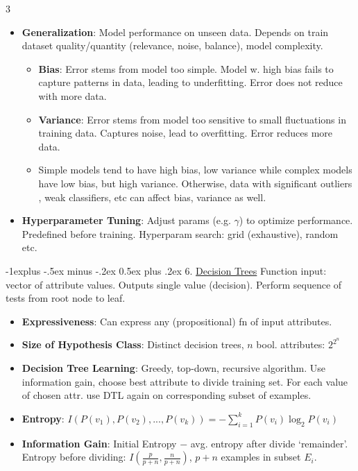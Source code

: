 \documentclass[a4paper, 9pt, landscape]{article}
\makeatletter
\renewcommand{\subsection}{\@startsection{subsection}{2}{0mm}%
                                {-1explus -.5ex minus -.2ex}%
                                {0.5ex plus .2ex}%
                                {\normalfont\normalsize\bfseries}}
\makeatother
\begin{document}
\begin{multicols*}{3}
\begin{itemize}[itemsep=-2pt]
\begin{itemize}[itemsep=-1.5pt]
            Recall ($\frac{TP}{TP + FN}$ - opt if FN costly), F1 Score: $\frac{2}{\frac{1}{P} +\frac{1}{R}} $
        \end{itemize}
        \item \textbf{Generalization}: Model performance on unseen data. Depends on train dataset quality/quantity (relevance, noise, balance), model complexity.
        \begin{itemize}
			\item \textbf{Bias}: Error stems from model too simple. Model w. high bias fails to capture patterns in data, leading to underfitting. Error does not reduce with more data.
			\item \textbf{Variance}: Error stems from model too sensitive to small fluctuations in training data. Captures noise, lead to overfitting. Error reduces more data.
			\item Simple models tend to have high bias, low variance while complex models have low bias, but high variance. Otherwise, data with significant outliers , weak classifiers, etc can affect bias, variance as well.
		\end{itemize}
        \item \textbf{Hyperparameter Tuning}: Adjust params (e.g. $\gamma$) to optimize performance. Predefined before training. Hyperparam search: grid (exhaustive), random etc. 
\end{itemize}


\subsection{6. \underline{Decision Trees}}
Function input: vector of attribute values. Outputs single value (decision). Perform sequence of tests from root node to leaf.
\begin{itemize}
\item \textbf{Expressiveness}: Can express any (propositional) fn of input attributes. 
\item \textbf{Size of Hypothesis Class}: Distinct decision trees, $ n $ bool. attributes: $2^{2^n}$
\item \textbf{Decision Tree Learning}: Greedy, top-down, recursive algorithm. Use information gain, choose best attribute to divide training set. For each value of chosen attr. use DTL again on corresponding subset of examples.
\item \textbf{Entropy}: $I(P(v_1), P(v_2), ..., P(v_k)) = - \sum_{i=1}^{k} P(v_i) \log_2 P(v_i)$
\item \textbf{Information Gain}: Initial Entropy $-$ avg. entropy after divide `remainder'. \\
Entropy before dividing: $I(\frac{p}{p+n},\frac{n}{p+n})$, $p + n$ examples in subset $E_i$.
\end{itemize}



\end{multicols*}
\end{document}

